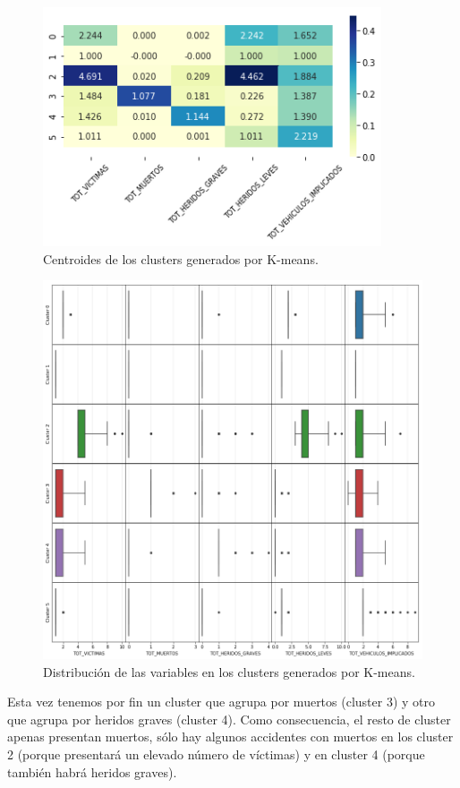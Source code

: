 \documentclass[oneside]{book}
\begin{document}
\begin{figure}[H]
  \centering
  \includegraphics[width=100mm]{figures/accidentes/k-means22centroids}
  \caption{Centroides de los clusters generados por K-means.}
  \label{fig:k-means22centroids}
\end{figure}

\begin{figure}[H]
  \centering
  \includegraphics[width=135mm]{figures/accidentes/k-means22distribution}
  \caption{Distribución de las variables en los clusters generados por
    K-means.}
  \label{fig:k-means22distribution}
\end{figure}

Esta vez tenemos por fin un cluster que agrupa por muertos (cluster 3)
y otro que agrupa por heridos graves (cluster 4). Como consecuencia,
el resto de cluster apenas presentan muertos, sólo hay algunos
accidentes con muertos en los cluster 2 (porque presentará un elevado
número de víctimas) y en cluster 4 (porque también habrá heridos
graves).
\end{document}
